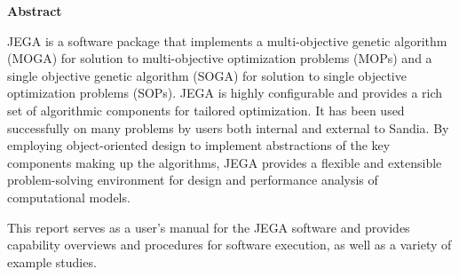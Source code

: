 \begin{center}
{\Large \bf Abstract}
\end{center}

JEGA is a software package that implements a multi-objective genetic
algorithm (MOGA) for solution to multi-objective optimization
problems (MOPs) and a single objective genetic algorithm (SOGA) for
solution to single objective optimization problems (SOPs). JEGA is
highly configurable and provides a rich set of algorithmic
components for tailored optimization.  It has been used successfully
on many problems by users both internal and external to Sandia.  By
employing object-oriented design to implement abstractions of the
key components making up the algorithms, JEGA provides a flexible
and extensible problem-solving environment for design and
performance analysis of computational models.

This report serves as a user's manual for the JEGA software and
provides capability overviews and procedures for software execution,
as well as a variety of example studies.
